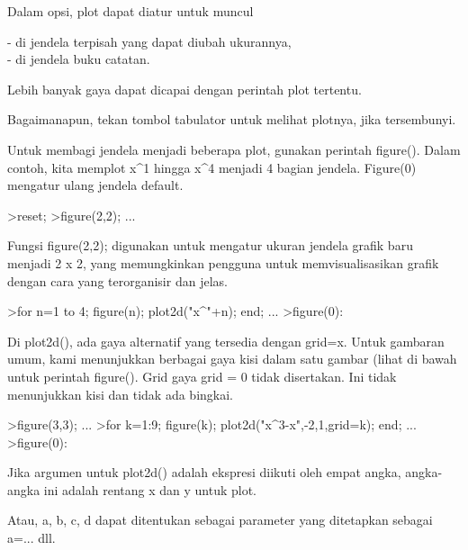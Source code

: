 \documentclass[a4paper,10pt]{article}
\begin{document}
\begin{eulernotebook}
\begin{eulercomment}
\begin{eulercomment}
\begin{eulercomment}
\begin{eulercomment}
\begin{eulercomment}
Dalam opsi, plot dapat diatur untuk muncul

- di jendela terpisah yang dapat diubah ukurannya,\\
- di jendela buku catatan.

Lebih banyak gaya dapat dicapai dengan perintah plot tertentu.

Bagaimanapun, tekan tombol tabulator untuk melihat plotnya, jika
tersembunyi.

Untuk membagi jendela menjadi beberapa plot, gunakan perintah
figure(). Dalam contoh, kita memplot x\textasciicircum{}1 hingga x\textasciicircum{}4 menjadi 4 bagian
jendela. Figure(0) mengatur ulang jendela default.
\end{eulercomment}
\begin{eulerprompt}
>reset;
>figure(2,2); ...
\end{eulerprompt}
\begin{eulercomment}
Fungsi figure(2,2); digunakan untuk mengatur ukuran jendela grafik
baru menjadi 2 x 2, yang memungkinkan pengguna untuk memvisualisasikan
grafik dengan cara yang terorganisir dan jelas.
\end{eulercomment}
\begin{eulerprompt}
>for n=1 to 4; figure(n); plot2d("x^"+n); end; ...
>figure(0):
\end{eulerprompt}
\begin{eulercomment}
Di plot2d(), ada gaya alternatif yang tersedia dengan grid=x. Untuk
gambaran umum, kami menunjukkan berbagai gaya kisi dalam satu gambar
(lihat di bawah untuk perintah figure(). Grid gaya grid = 0 tidak
disertakan. Ini tidak menunjukkan kisi dan tidak ada bingkai.
\end{eulercomment}
\begin{eulerprompt}
>figure(3,3); ...
>for k=1:9; figure(k); plot2d("x^3-x",-2,1,grid=k); end; ...
>figure(0):
\end{eulerprompt}
\begin{eulercomment}
Jika argumen untuk plot2d() adalah ekspresi diikuti oleh empat angka,
angka-angka ini adalah rentang x dan y untuk plot.

Atau, a, b, c, d dapat ditentukan sebagai parameter yang ditetapkan
sebagai a=... dll.


\end{eulercomment}
\end{eulercomment}
\end{eulercomment}
\end{eulercomment}
\end{eulercomment}
\end{eulernotebook}
\end{document}
